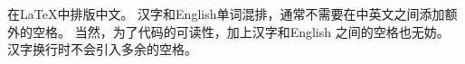 \documentclass{ctexart}
\begin{document}
在\LaTeX{}中排版中文。
汉字和English单词混排，通常不需要在中英文之间添加额外的空格。
当然，为了代码的可读性，加上汉字和English 之间的空格也无妨。
汉字换行时不会引入多余的空格。
\end{document}

